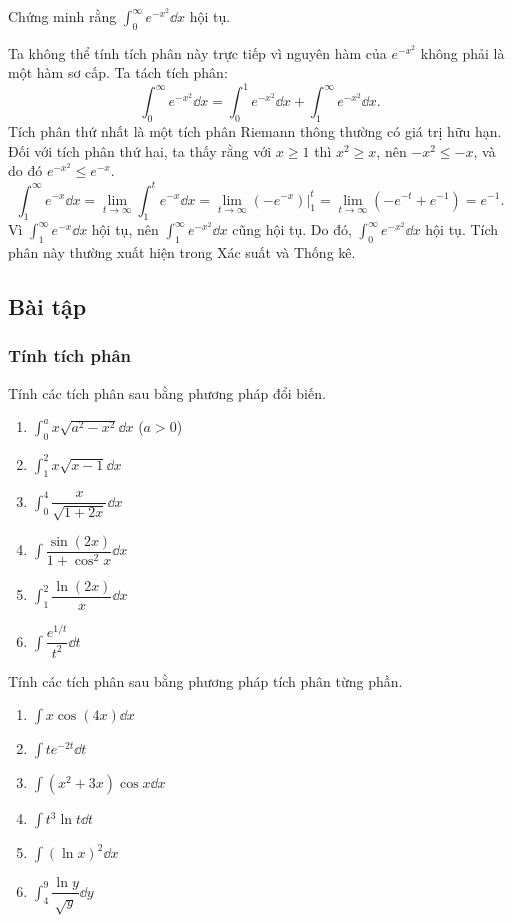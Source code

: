 \begin{example}
    Chứng minh rằng $\int_0^\infty e^{-x^2} \dd x$ hội tụ.
\end{example}
\begin{solution}
    Ta không thể tính tích phân này trực tiếp vì nguyên hàm của $e^{-x^2}$ không phải là một hàm sơ cấp. Ta tách tích phân:
    \[
        \int_0^\infty e^{-x^2} \dd x = \int_0^1 e^{-x^2} \dd x + \int_1^\infty e^{-x^2} \dd x.
    \]
    Tích phân thứ nhất là một tích phân Riemann thông thường có giá trị hữu hạn. Đối với tích phân thứ hai, ta thấy rằng với $x \ge 1$ thì $x^2 \ge x$, nên $-x^2 \le -x$, và do đó $e^{-x^2} \le e^{-x}$.
    \[
        \int_1^\infty e^{-x} \dd x = \lim_{t \to \infty} \int_1^t e^{-x} \dd x = \lim_{t \to \infty} (-e^{-x})\bigg|_1^t = \lim_{t \to \infty} (-e^{-t} + e^{-1}) = e^{-1}.
    \]
    Vì $\int_1^\infty e^{-x} \dd x$ hội tụ, nên $\int_1^\infty e^{-x^2} \dd x$ cũng hội tụ. Do đó, $\int_0^\infty e^{-x^2} \dd x$ hội tụ.
    Tích phân này thường xuất hiện trong Xác suất và Thống kê.
\end{solution}

\subsection{Bài tập}

\subsubsection{Tính tích phân}
\begin{exercise}
    Tính các tích phân sau bằng phương pháp đổi biến.
    \begin{enumerate}[label=(\alph*)]
        \item $\int_0^a x\sqrt{a^2 - x^2} \dd x$ \quad ($a>0$)
        \item $\int_1^2 x\sqrt{x-1} \dd x$
        \item $\int_0^4 \dfrac{x}{\sqrt{1+2x}} \dd x$
        \item $\int \dfrac{\sin(2x)}{1+\cos^2 x} \dd x$
        \item $\int_1^2 \dfrac{\ln(2x)}{x} \dd x$
        \item $\int \dfrac{e^{1/t}}{t^2} \dd t$
    \end{enumerate}
\end{exercise}

\begin{exercise}
    Tính các tích phân sau bằng phương pháp tích phân từng phần.
    \begin{enumerate}[label=(\alph*)]
        \item $\int x \cos(4x) \dd x$
        \item $\int t e^{-2t} \dd t$
        \item $\int (x^2+3x)\cos x \dd x$
        \item $\int t^3 \ln t \dd t$
        \item $\int (\ln x)^2 \dd x$
        \item $\int_4^9 \dfrac{\ln y}{\sqrt{y}} \dd y$
    \end{enumerate}
\end{exercise}

